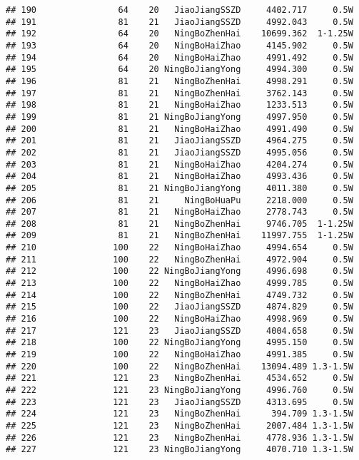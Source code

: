 \documentclass[]{article}
\begin{document}
\begin{verbatim}
## 190                64    20   JiaoJiangSSZD     4402.717     0.5W
## 191                81    21   JiaoJiangSSZD     4992.043     0.5W
## 192                64    20   NingBoZhenHai    10699.362  1-1.25W
## 193                64    20   NingBoHaiZhao     4145.902     0.5W
## 194                64    20   NingBoHaiZhao     4991.492     0.5W
## 195                64    20 NingBoJiangYong     4994.300     0.5W
## 196                81    21   NingBoZhenHai     4998.291     0.5W
## 197                81    21   NingBoZhenHai     3762.143     0.5W
## 198                81    21   NingBoHaiZhao     1233.513     0.5W
## 199                81    21 NingBoJiangYong     4997.950     0.5W
## 200                81    21   NingBoHaiZhao     4991.490     0.5W
## 201                81    21   JiaoJiangSSZD     4964.275     0.5W
## 202                81    21   JiaoJiangSSZD     4995.056     0.5W
## 203                81    21   NingBoHaiZhao     4204.274     0.5W
## 204                81    21   NingBoHaiZhao     4993.436     0.5W
## 205                81    21 NingBoJiangYong     4011.380     0.5W
## 206                81    21     NingBoHuaPu     2218.000     0.5W
## 207                81    21   NingBoHaiZhao     2778.743     0.5W
## 208                81    21   NingBoZhenHai     9746.705  1-1.25W
## 209                81    21   NingBoZhenHai    11997.755  1-1.25W
## 210               100    22   NingBoHaiZhao     4994.654     0.5W
## 211               100    22   NingBoZhenHai     4972.904     0.5W
## 212               100    22 NingBoJiangYong     4996.698     0.5W
## 213               100    22   NingBoHaiZhao     4999.785     0.5W
## 214               100    22   NingBoZhenHai     4749.732     0.5W
## 215               100    22   JiaoJiangSSZD     4874.829     0.5W
## 216               100    22   NingBoHaiZhao     4998.969     0.5W
## 217               121    23   JiaoJiangSSZD     4004.658     0.5W
## 218               100    22 NingBoJiangYong     4995.150     0.5W
## 219               100    22   NingBoHaiZhao     4991.385     0.5W
## 220               100    22   NingBoZhenHai    13094.489 1.3-1.5W
## 221               121    23   NingBoZhenHai     4534.652     0.5W
## 222               121    23 NingBoJiangYong     4996.760     0.5W
## 223               121    23   JiaoJiangSSZD     4313.695     0.5W
## 224               121    23   NingBoZhenHai      394.709 1.3-1.5W
## 225               121    23   NingBoZhenHai     2007.484 1.3-1.5W
## 226               121    23   NingBoZhenHai     4778.936 1.3-1.5W
## 227               121    23 NingBoJiangYong     4070.710 1.3-1.5W

\end{verbatim}
\end{document}

